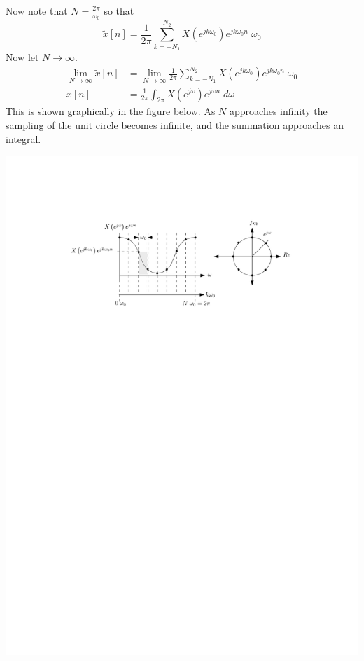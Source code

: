 Now note that $N = \frac{2\pi}{\omega_0}$ so that
\[
\tilde{x}[n] = \frac{1}{2\pi} \sum\limits_{k = -N_1}^{N_2} X\left(e^{jk\omega_0}\right) e^{jk\omega_0 n} \; \omega_0
\]
Now let $N \rightarrow \infty$.
\begin{align*}
  \lim_{N\rightarrow \infty} \tilde{x}[n] &= \lim_{N\rightarrow \infty} \frac{1}{2\pi} \sum\limits_{k = -N_1}^{N_2} X\left(e^{jk\omega_0}\right) e^{jk\omega_0 n} \; \omega_0\\
  x[n] &= \frac{1}{2\pi} \int_{2\pi} X\left(e^{j\omega}\right) e^{j\omega n} \; d\omega
\end{align*}
This is shown graphically in the figure below. As $N$ approaches infinity the sampling of the unit circle becomes infinite, and the summation approaches an integral.

\begin{center}
  \includegraphics[scale=0.9]{graphics/dt-fourier-limit.pdf}
\end{center}

